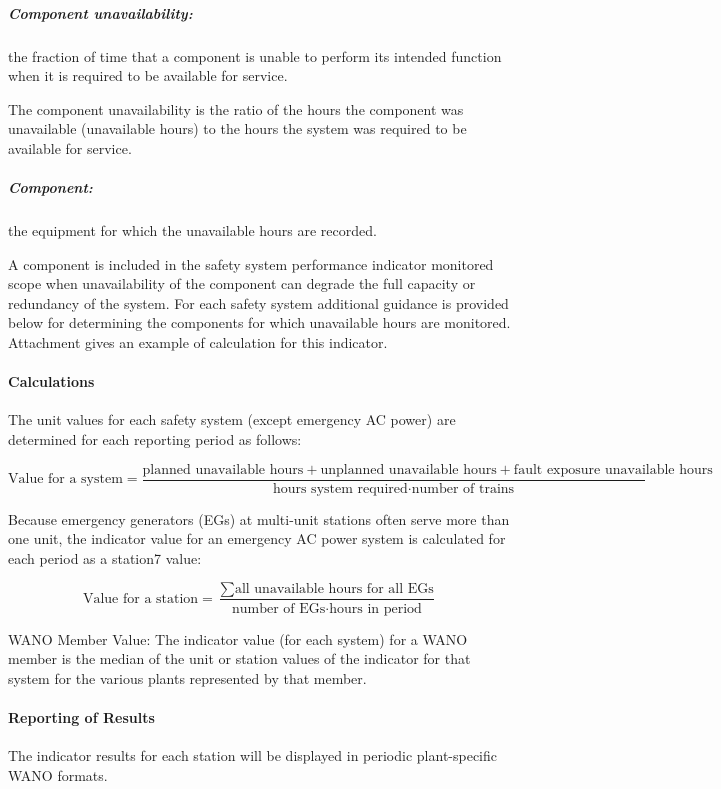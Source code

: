 \subparagraph {Component unavailability:} the fraction of time that a
component is unable to perform its intended function when it is
required to be available for service.

The component unavailability is the ratio of the hours the component
was unavailable (unavailable hours) to the hours the system was
required to be available for service.

\subparagraph {Component:} the equipment for which the unavailable
hours are recorded.

A component is included in the safety system performance indicator
monitored scope when unavailability of the component can degrade the
full capacity or redundancy of the system. For each safety system
additional guidance is provided below for determining the components
for which unavailable hours are monitored. Attachment gives an example
of calculation for this indicator.


\paragraph{Calculations}

The unit values for each safety system (except emergency AC power) are
determined for each reporting period as follows:

$$ \text{Value for a system} = \frac{\text{planned unavailable
      hours}+\text{unplanned unavailable hours}+\text{fault exposure
      unavailable hours}}{\text{hours system required} \cdot
      \text{number of trains}} $$

Because emergency generators (EGs) at multi-unit stations often serve
more than one unit, the indicator value for an emergency AC power
system is calculated for each period as a station7 value:

$$ \text{Value for a station} = \frac{\sum{\text{all unavailable hours for all
EGs}}}{\text{number of EGs} \cdot \text{hours in period}} $$

WANO Member Value: The indicator value (for each system) for a WANO
member is the median of the unit or station values of the indicator
for that system for the various plants represented by that member.

\paragraph{Reporting of Results}

The indicator results for each station will be displayed in periodic
plant-specific WANO formats.

